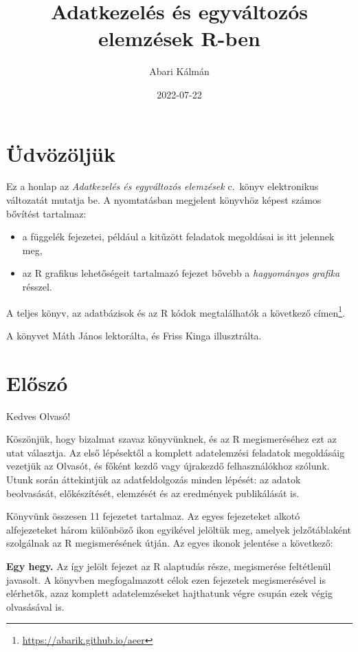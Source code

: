 \documentclass[
]{book}
\title{Adatkezelés és egyváltozós elemzések R-ben}
\author{Abari Kálmán}
\date{2022-07-22}
\makeatletter
\DeclareRobustCommand{\href}[2]{#2\footnote{\url{#1}}}
\providecommand{\tightlist}{%
  \setlength{\itemsep}{0pt}\setlength{\parskip}{0pt}}
\renewcommand{\href}[2]{#2\footnote{\url{#1}}}
\newenvironment{kframe}{%
\medskip{}
\setlength{\fboxsep}{.8em}
 \def\at@end@of@kframe{}%
 \ifinner\ifhmode%
  \def\at@end@of@kframe{\end{minipage}}%
  \begin{minipage}{\columnwidth}%
 \fi\fi%
 \def\FrameCommand##1{\hskip\@totalleftmargin \hskip-\fboxsep
 \colorbox{shadecolor}{##1}\hskip-\fboxsep
     \hskip-\linewidth \hskip-\@totalleftmargin \hskip\columnwidth}%
 \MakeFramed {\advance\hsize-\width
   \@totalleftmargin\z@ \linewidth\hsize
   \@setminipage}}%
 {\par\unskip\endMakeFramed%
 \at@end@of@kframe}
\newenvironment{rmdblock}[1]
  {
  \begin{itemize}
  \renewcommand{\labelitemi}{
    \raisebox{-.7\height}[0pt][0pt]{
      {\setkeys{Gin}{width=3em,keepaspectratio}\texttt{[image: images/\#1]}}
    }
  }
  \setlength{\fboxsep}{1em}
  \begin{kframe}
  \item
  }
  {
  \end{kframe}
  \end{itemize}
  }
\newenvironment{rmdlevel1}
  {\begin{rmdblock}{level1}}
  {\end{rmdblock}}
\makeatother
\begin{document}
\maketitle

{
\hypersetup{linkcolor=}
\setcounter{tocdepth}{1}
\tableofcontents
}
\hypertarget{uxfcdvuxf6zuxf6ljuxfck}{%
\chapter*{Üdvözöljük}\label{uxfcdvuxf6zuxf6ljuxfck}}

Ez a honlap az \emph{Adatkezelés és egyváltozós elemzések} c.~könyv elektronikus változatát mutatja be. A nyomtatásban megjelent könyvhöz képest számos bővítést tartalmaz:

\begin{itemize}
\tightlist
\item
  a függelék fejezetei, például a kitűzött feladatok megoldásai is itt jelennek meg,
\item
  az R grafikus lehetőségeit tartalmazó fejezet bővebb a \emph{hagyományos grafika} résszel.
\end{itemize}

A teljes könyv, az adatbázisok és az R kódok megtalálhatók a \href{https://abarik.github.io/aeer}{következő címen}.

A könyvet Máth János lektorálta, és Friss Kinga illusztrálta.

\hypertarget{eloszo}{%
\chapter*{Előszó}\label{eloszo}}

Kedves Olvasó!

Köszönjük, hogy bizalmat szavaz könyvünknek, és az R megismeréséhez ezt az utat választja. Az első lépésektől a komplett adatelemzési feladatok megoldásáig vezetjük az Olvasót, és főként kezdő vagy újrakezdő felhasználókhoz szólunk. Utunk során áttekintjük az adatfeldolgozás minden lépését: az adatok beolvasását, előkészítését, elemzését és az eredmények publikálását is.

Könyvünk összesen 11 fejezetet tartalmaz. Az egyes fejezeteket alkotó alfejezeteket három különböző ikon egyikével jelöltük meg, amelyek jelzőtáblaként szolgálnak az R megismerésének útján. Az egyes ikonok jelentése a következő:

\begin{rmdlevel1}
\textbf{Egy hegy.} Az így jelölt fejezet az R alaptudás része,
megismerése feltétlenül javasolt. A könyvben megfogalmazott célok ezen
fejezetek megismerésével is elérhetők, azaz komplett adatelemzéseket
hajthatunk végre csupán ezek végig olvasásával is.
\end{rmdlevel1}
\end{document}

